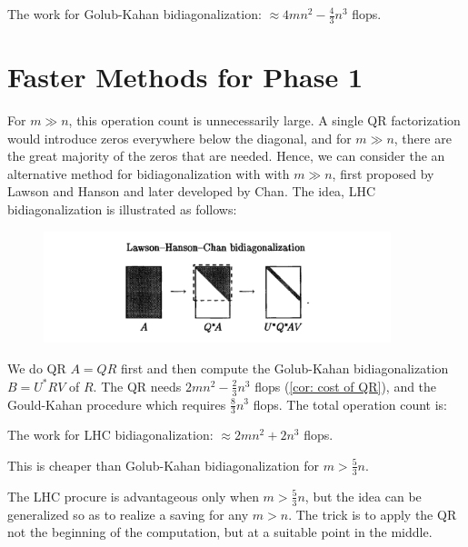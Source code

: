 \begin{proposition}
\label{prop: Work for GK bi}
The work for Golub-Kahan bidiagonalization: $ \approx 4mn^{2}  - \frac{4}{3}n^3 $ flops. 
\end{proposition}

\section{Faster Methods for Phase 1} 
For $ m\gg n $, this operation count is unnecessarily large. A single QR factorization would introduce zeros everywhere below the diagonal, and for $ m\gg n $, there are the great majority of the zeros that are needed.  Hence, we can consider the an alternative method for bidiagonalization with with $ m\gg n $, first proposed by Lawson and Hanson and later developed by Chan. The idea, LHC bidiagonalization is illustrated as follows: 
\begin{figure}[H]
    \centering
    \includegraphics[width=0.9\textwidth]{figures/31-3.png}
\end{figure}
We do QR $A=QR$ first and then compute the Golub-Kahan bidiagonalization $B = U^*R V$ of $R$. The QR needs $ 2mn^{2}  - \frac{2}{3}n^3 $ flops (\autoref{cor: cost of QR}), and the Gould-Kahan procedure which requires $ \frac{8}{3}n^3 $ flops. The total operation count is: 


\begin{corollary}
\label{cor: cost of LHC}
The work for LHC bidiagonalization: $ \approx 2mn^{2}  + 2n^3 $ flops. 
\end{corollary}

This is cheaper than Golub-Kahan bidiagonalization for $ m>\frac{5}{3}n $. 

The LHC procure is advantageous only when $ m>\frac{5}{3}n $, but the idea can be generalized so as to realize a saving for any $ m>n $. The trick is to apply the QR not the beginning of the computation, but at a suitable point in the middle.  


